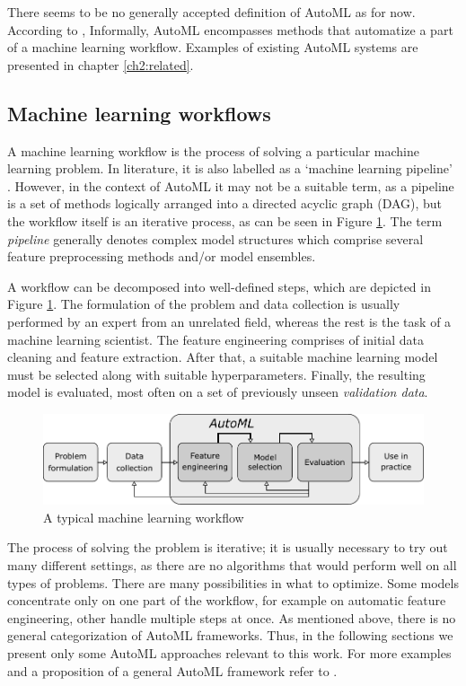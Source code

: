 There seems to be no generally accepted definition of AutoML as for now.
According to \cite{DBLP:journals/corr/abs-1810-13306},
Informally, AutoML encompasses methods that automatize a part of a machine
learning workflow. Examples of existing AutoML systems are presented in chapter
\ref{ch2:related}.

\subsection{Machine learning workflows}
A machine learning workflow is the process of solving a particular machine
learning problem. In literature, it is also labelled as a `machine learning
pipeline' \cite{DBLP:journals/corr/abs-1810-13306}. However, in the context
of AutoML it may not be a suitable term, as a pipeline is a set of methods
logically arranged into a directed acyclic graph (DAG), but the workflow itself
is an iterative process, as can be seen in Figure \ref{pic01:workflow}.
The term \emph{pipeline} generally denotes complex model structures which
comprise several feature preprocessing methods and/or model
ensembles.

A workflow can be decomposed into well-defined steps, which are depicted in
Figure \ref{pic01:workflow}. The formulation of the problem and data collection
is usually performed by an expert from an unrelated field, whereas the rest is
the task of a machine learning scientist. The feature engineering comprises
of initial data cleaning and feature extraction.
After that, a suitable machine learning model must be selected along with
suitable hyperparameters. Finally, the resulting model is evaluated, most
often on a set of previously unseen \emph{validation data}.

\begin{figure}[ht]\centering
\includegraphics[width=\textwidth]{../img/workflow-pdfa.pdf}
\caption{A typical machine learning workflow}
\label{pic01:workflow}
\end{figure}

The process of solving the problem is iterative; it is usually necessary to try
out many different settings, as there are no algorithms that would perform
well on all types of problems.
There are many possibilities in what to optimize. Some models concentrate only
on one part of the workflow, for example on automatic feature engineering,
other handle multiple steps at once. As mentioned above, there is no general
categorization %
of AutoML frameworks. Thus, in the following sections we present only some
AutoML approaches relevant to this work. For more examples and a proposition
of a general AutoML framework refer to \cite{DBLP:journals/corr/abs-1810-13306}.

